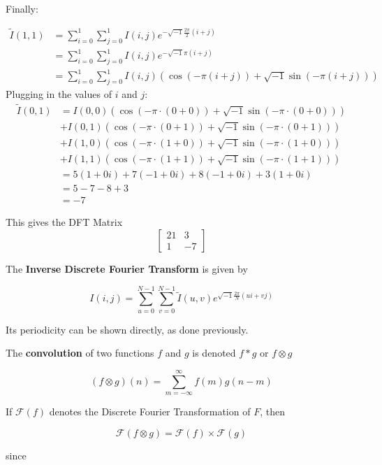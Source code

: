 \documentclass[a4paper]{article}
\begin{document}
Finally:

	    \begin{align*}	     
	    \tilde{I}(1,1)&=\sum_{i=0}^1\sum_{j=0}^1I(i, j)e^{-\sqrt{-1}\frac{2\pi}{2}\left(i + j\right)}
			\\&=\sum_{i=0}^1\sum_{j=0}^1I(i,j)e^{-\sqrt{-1}\pi (i+j)}
			\\&=\sum_{i=0}^1\sum_{j=0}^1I(i,j)\left(\cos{\left(-\pi (i+j)\right)}+\sqrt{-1}\sin{\left(-\pi (i+j)\right)}\right)
	    \end{align*}
	    Plugging in the values of $i$ and $j$:
	    \begin{align*}
	    \tilde{I}(0,1)&=I(0,0)\left(\cos{\left(-\pi\cdot(0+0)\right)}+\sqrt{-1}\sin{\left(-\pi\cdot(0+0)\right)}\right)
			\\&+I(0,1)\left(\cos{\left(-\pi\cdot(0+1)\right)}+\sqrt{-1}\sin{\left(-\pi\cdot(0+1)\right)}\right)
			\\&+I(1,0)\left(\cos{\left(-\pi\cdot(1+0)\right)}+\sqrt{-1}\sin{\left(-\pi\cdot(1+0)\right)}\right)
			\\&+I(1,1)\left(\cos{\left(-\pi\cdot(1+1)\right)}+\sqrt{-1}\sin{\left(-\pi\cdot(1+1)\right)}\right)
			\\&=5\left(1+0i\right)+7\left(-1+0i\right)+8\left(-1+0i\right)+3\left(1+0i\right)
			\\&=5-7-8+3
			\\&=-7
	    \end{align*}
	     
This gives the DFT Matrix \[\begin{bmatrix}21&3\\1&-7\end{bmatrix}\]

The \textbf{Inverse Discrete Fourier Transform} is given by 

\[I(i, j)=\sum_{u=0}^{N-1}\sum_{v=0}^{N-1}\tilde{I}(u,v)e^{\sqrt{-1}\frac{2\pi}{N}\left(ui+vj\right)}\]

Its periodicity can be shown directly, as done previously. 

The \textbf{convolution} of two functions $f$ and $g$ is denoted $f*g$ or $f\otimes g$

\[(f\otimes g)(n)=\sum_{m=-\infty}^{\infty}f(m)g(n-m)\]

If $\mathcal{F}(f)$ denotes the Discrete Fourier Transformation of $F$, then 

\[\mathcal{F}(f\otimes g)=\mathcal{F}(f)\times\mathcal{F}(g)\]

since
\end{document}
